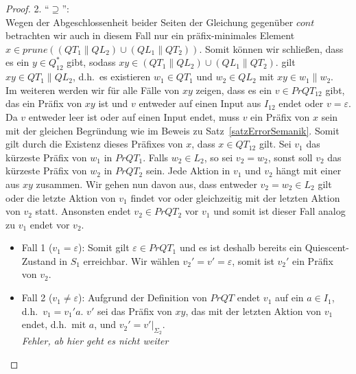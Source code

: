 \begin{proof}
  2. ``$\supseteq$'':\\
  Wegen der Abgeschlossenheit beider Seiten der Gleichung gegenüber $cont$
  betrachten wir auch in diesem Fall nur ein präfix-minimales Element $x\in
  prune((QT_1\|QL_2)\cup (QL_1\|QT_2))$. Somit können wir schließen, dass es
  ein $y\in Q_{12}^*$ gibt, sodass $xy\in (QT_1\|QL_2)\cup (QL_1\|QT_2)$.
  \OBdA{} gilt $xy\in QT_1\|QL_2$, d.h.\ es existieren $w_1\in QT_1$ und
  $w_2\in QL_2$ mit $xy\in w_1\| w_2$.\\
  Im weiteren werden wir für alle Fälle von $xy$ zeigen, dass es ein $v\in
  PrQT_{12}$ gibt, das ein Präfix von $xy$ ist und $v$ entweder auf einen Input
  aus $I_{12}$ endet oder $v=\varepsilon$. Da $v$ entweder leer ist oder auf
  einen Input endet, muss $v$ ein Präfix von $x$ sein mit der gleichen
  Begründung wie im Beweis zu Satz~\ref{satzErrorSemanik}. Somit gilt durch die
  Existenz dieses Präfixes von $x$, dass $x\in QT_{12}$ gilt. Sei $v_1$ das
  kürzeste Präfix von $w_1$ in $PrQT_1$. Falls $w_2\in L_2$, so sei $v_2=w_2$,
  sonst soll $v_2$ das kürzeste Präfix von $w_2$ in $PrQT_2$ sein. Jede Aktion
  in $v_1$ und $v_2$ hängt mit einer aus $xy$ zusammen. Wir gehen nun davon
  aus, dass entweder $v_2=w_2\in L_2$ gilt oder die letzte Aktion von $v_1$
  findet vor oder gleichzeitig mit der letzten Aktion von $v_2$ statt.
  Ansonsten endet $v_2\in PrQT_2$ vor $v_1$ und somit ist dieser Fall analog zu
  $v_1$ endet vor $v_2$.
  \begin{itemize}
    \item Fall 1 ($v_1=\varepsilon$): Somit gilt $\varepsilon\in PrQT_1$ und es
      ist deshalb bereits ein Quiescent-Zustand in $S_1$ erreichbar. Wir wählen
      $v_2'=v'=\varepsilon$, somit ist $v_2'$ ein Präfix von $v_2$.
    \item Fall 2 ($v_1\neq \varepsilon$): Aufgrund der Definition von $PrQT$
      endet $v_1$ auf ein $a\in I_1$, d.h.\ $v_1=v_1'a$. $v'$ sei das Präfix
      von $xy$, das mit der letzten Aktion von $v_1$ endet, d.h.\ mit $a$, und
      $v_2'=v'|_{\Sigma _2}$.\\
      \emph{Fehler, ab hier geht es nicht weiter}
  \end{itemize}


\end{proof}
